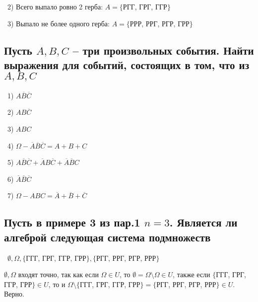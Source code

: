 \medskip
\noindent~2) Всего выпало ровно 2 герба: $A = \{$РГГ, ГРГ, ГГР$\}$

\medskip
\noindent~3) Выпало не более одного герба: $A = \{$РРР, РРГ, РГР, ГРР$\}$


\subsection{Пусть $A, B, C$ -- три произвольных события. Найти выражения для событий, состоящих
в том, что из $A, B, C$}

\noindent~1) $A\overline{B}\overline{C}$

\smallskip
\noindent~2) $AB\overline{C}$

\smallskip
\noindent~3) $ABC$ 

\smallskip
\noindent~4) $\Omega - \overline{A}\overline{B}\overline{C} = A + B + C$

\smallskip
\noindent~5) $A\overline{B}\overline{C} + \overline{A}B\overline{C} + \overline{A}\overline{B}C$

\smallskip
\noindent~6) $\overline{A}\overline{B}\overline{C}$

\smallskip
\noindent~7) $\Omega - ABC = \overline{A} + \overline{B} + \overline{C}$


\subsection{Пусть в примере 3 из пар.1 $n = 3$. Является ли алгеброй следующая система подмножеств}

\noindent~$\emptyset, \Omega, \{$ГГГ, ГРГ, ГГР, ГРР$\}, \{$РГГ, РРГ, РГР, РРР$\}$

\smallskip
\noindent $\emptyset, \Omega$ входят точно, так как если $\Omega \in U$, то $\emptyset = \Omega \setminus
\Omega \in U$, также если $\{$ГГГ, ГРГ, ГГР, ГРР$\} \in U$, то и $\Omega \setminus \{$ГГГ, ГРГ, ГГР, ГРР$\} = 
\{$РГГ, РРГ, РГР, РРР$\} \in U$. Верно.


